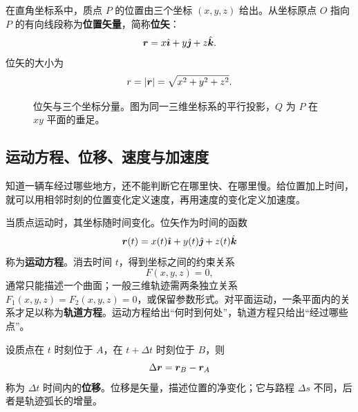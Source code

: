 在直角坐标系中，质点 $P$ 的位置由三个坐标 $(x,y,z)$ 给出。从坐标原点 $O$ 指向 $P$ 的有向线段称为\textbf{位置矢量}，简称\textbf{位矢}：
\begin{equation}
\boldsymbol{r}=x\hat{\boldsymbol{\imath}}+y\hat{\boldsymbol{\jmath}}+z\hat{\boldsymbol{k}} .
\label{eq:position}
\end{equation}
位矢的大小为
\begin{equation}
r=|\boldsymbol{r}|=\sqrt{x^2+y^2+z^2}.
\end{equation}

\begin{figure}[htbp]
\centering
{}
\caption{位矢与三个坐标分量。图为同一三维坐标系的平行投影，$Q$ 为 $P$ 在 $xy$ 平面的垂足。}
\label{fig:cartesian}
\end{figure}

\subsection{运动方程、位移、速度与加速度}

知道一辆车经过哪些地方，还不能判断它在哪里快、在哪里慢。给位置加上时间，就可以用相邻时刻的位置变化定义速度，再用速度的变化定义加速度。

当质点运动时，其坐标随时间变化。位矢作为时间的函数
\begin{equation}
\boldsymbol{r}(t)=x(t)\hat{\boldsymbol{\imath}}+y(t)\hat{\boldsymbol{\jmath}}+z(t)\hat{\boldsymbol{k}}
\label{eq:motion}
\end{equation}
称为\textbf{运动方程}。消去时间 $t$，得到坐标之间的约束关系
\begin{equation}
F(x,y,z)=0,
\label{eq:orbit}
\end{equation}
通常只能描述一个曲面；一般三维轨迹需两条独立关系 $F_1(x,y,z)=F_2(x,y,z)=0$，或保留参数形式。对平面运动，一条平面内的关系才足以称为\textbf{轨道方程}。运动方程给出“何时到何处”，轨道方程只给出“经过哪些点”。


设质点在 $t$ 时刻位于 $A$，在 $t+\Delta t$ 时刻位于 $B$，则
\begin{equation}
\Delta\boldsymbol{r}=\boldsymbol{r}_B-\boldsymbol{r}_A
\end{equation}
称为 $\Delta t$ 时间内的\textbf{位移}。位移是矢量，描述位置的净变化；它与路程 $\Delta s$ 不同，后者是轨迹弧长的增量。

